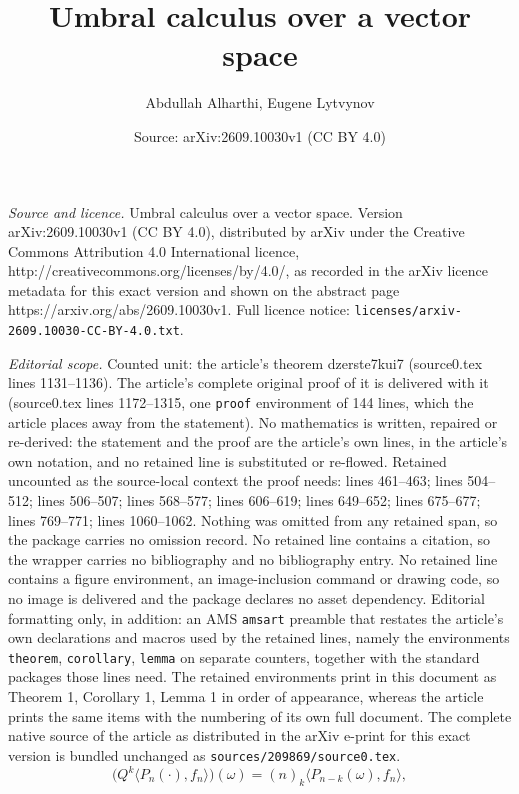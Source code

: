 \documentclass[10pt,a4paper]{amsart}
\title{Umbral calculus over a vector space}
\author{Abdullah Alharthi, Eugene Lytvynov}
\date{Source: arXiv:2609.10030v1 (CC BY 4.0)}
\begin{document}
\maketitle

\noindent\emph{Source and licence.} Umbral calculus over a vector space. Version arXiv:2609.10030v1 (CC BY 4.0), distributed by arXiv under the Creative Commons Attribution 4.0 International licence, http://creativecommons.org/licenses/by/4.0/, as recorded in the arXiv licence metadata for this exact version and shown on the abstract page https://arxiv.org/abs/2609.10030v1. Full licence notice: \texttt{licenses/arxiv-2609.10030-CC-BY-4.0.txt}.\par\smallskip

\noindent\textit{Editorial scope.} Counted unit: the article's theorem dzerste7kui7 (source0.tex lines 1131--1136). The article's complete original proof of it is delivered with it (source0.tex lines 1172--1315, one \texttt{proof} environment of 144 lines, which the article places away from the statement). No mathematics is written, repaired or re-derived: the statement and the proof are the article's own lines, in the article's own notation, and no retained line is substituted or re-flowed.  Retained uncounted as the source-local context the proof needs: lines 461--463; lines 504--512; lines 506--507; lines 568--577; lines 606--619; lines 649--652; lines 675--677; lines 769--771; lines 1060--1062.  Nothing was omitted from any retained span, so the package carries no omission record.  No retained line contains a citation, so the wrapper carries no bibliography and no bibliography entry.  No retained line contains a figure environment, an image-inclusion command or drawing code, so no image is delivered and the package declares no asset dependency.  Editorial formatting only, in addition: an AMS \texttt{amsart} preamble that restates the article's own declarations and macros used by the retained lines, namely the environments \texttt{theorem}, \texttt{corollary}, \texttt{lemma} on separate counters, together with the standard packages those lines need.  The retained environments print in this document as Theorem 1, Corollary 1, Lemma 1 in order of appearance, whereas the article prints the same items with the numbering of its own full document.  The complete native source of the article as distributed in the arXiv e-print for this exact version is bundled unchanged as \texttt{sources/209869/source0.tex}.
\begin{equation}\label{ge4ew34wq43w}
\big(Q^{k}\langle P_n(\cdot),f_n\rangle\big)(\omega)=(n)_k\langle P_{n-k}(\omega),f_n\rangle,
\end{equation}
\end{document}
